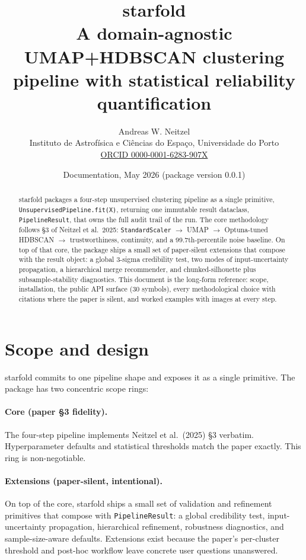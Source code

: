 \documentclass[11pt,a4paper]{article}
\title{\textbf{\textsf{starfold}}\\[0.4em]
       \large A domain-agnostic UMAP+HDBSCAN clustering pipeline with statistical reliability quantification}
\author{Andreas W. Neitzel\\
        \small Instituto de Astrofísica e Ciências do Espaço, Universidade do Porto\\
        \small \href{https://orcid.org/0000-0001-6283-907X}{ORCID 0000-0001-6283-907X}}
\date{Documentation, May 2026 (package version 0.0.1)}
\begin{document}
\maketitle

\begin{abstract}
\noindent
\textsf{starfold} packages a four-step unsupervised clustering pipeline as a single primitive, \texttt{UnsupervisedPipeline.fit(X)}, returning one immutable result dataclass, \texttt{PipelineResult}, that owns the full audit trail of the run. The core methodology follows §3 of Neitzel et al.\ 2025: \texttt{StandardScaler} $\rightarrow$ UMAP $\rightarrow$ Optuna-tuned HDBSCAN $\rightarrow$ trustworthiness, continuity, and a 99.7th-percentile noise baseline. On top of that core, the package ships a small set of paper-silent extensions that compose with the result object: a global 3-sigma credibility test, two modes of input-uncertainty propagation, a hierarchical merge recommender, and chunked-silhouette plus subsample-stability diagnostics. This document is the long-form reference: scope, installation, the public API surface (\num{30} symbols), every methodological choice with citations where the paper is silent, and worked examples with images at every step.
\end{abstract}

\tableofcontents
\vspace{1em}

\section{Scope and design}
\label{sec:scope}

\textsf{starfold} commits to one pipeline shape and exposes it as a single primitive. The package has two concentric scope rings:

\paragraph{Core (paper §3 fidelity).} The four-step pipeline implements Neitzel et al.\ (2025) §3 verbatim. Hyperparameter defaults and statistical thresholds match the paper exactly. This ring is non-negotiable.

\paragraph{Extensions (paper-silent, intentional).} On top of the core, \textsf{starfold} ships a small set of validation and refinement primitives that compose with \texttt{PipelineResult}: a global credibility test, input-uncertainty propagation, hierarchical refinement, robustness diagnostics, and sample-size-aware defaults. Extensions exist because the paper's per-cluster threshold and post-hoc workflow leave concrete user questions unanswered.
\end{document}
